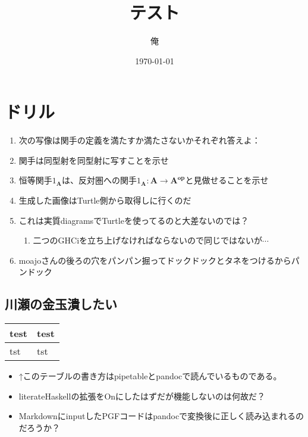 \documentclass[5pt]{ltjsarticle}
\date{\today}
\author{俺}
\title{テスト}
\begin{document}
\maketitle
\section*{ドリル}

\begin{enumerate}
\item
  次の写像は関手の定義を満たすか満たさないかそれぞれ答えよ：
\item
  関手は同型射を同型射に写すことを示せ
\item
  恒等関手\(1_\mathbf{A}\)は、反対圏への関手\(1_\mathbf{A}: \mathbf{A} \to \mathbf{A^{\mathbf{op}}}\)と見做せることを示せ
\item
  生成した画像はTurtle側から取得しに行くのだ
\item
  これは実質diagramsでTurtleを使ってるのと大差ないのでは？

  \begin{enumerate}
  
  \item
    二つのGHCiを立ち上げなければならないので同じではないが\(\cdots\)
  \end{enumerate}
\item
  moajoさんの後ろの穴をパンパン掘ってドックドックとタネをつけるからパンドック
\end{enumerate}

\subsection{川瀬の金玉潰したい}

\begin{longtable}[]{@{}ll@{}}
\toprule
test & test\tabularnewline
\midrule
\endhead
tst & tst\tabularnewline
\bottomrule
\end{longtable}

\begin{itemize}
\item
  ↑このテーブルの書き方はpipetableとpandocで読んでいるものである。
\item
  literateHaskellの拡張をOnにしたはずだが機能しないのは何故だ？
\item
  MarkdownにinputしたPGFコードはpandocで変換後に正しく読み込まれるのだろうか？
\end{itemize}
\end{document}
